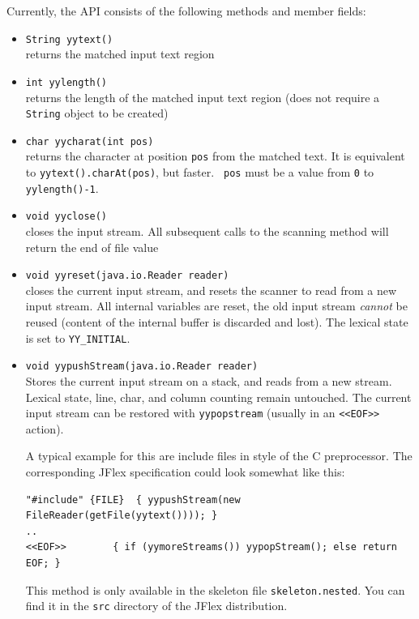 \documentclass[11pt]{scrartcl}
\begin{document}
Currently, the API consists of the following methods and member fields:
\begin{itemize}
\item \texttt{String yytext()}\\
  returns the matched input text region

\item \texttt{int yylength()}\\
  returns the length of the matched input text region (does not require
  a \texttt{String} object to be created)
  
\item \texttt{char yycharat(int pos)}\\
  returns the character at position \texttt{pos} from the matched text.
  It is equivalent to \texttt{yytext().charAt(pos)}, but faster.  {\tt
  pos} must be a value from \texttt{0} to \texttt{yylength()-1}.

\item \texttt{void yyclose()}\\
  closes the input stream. All subsequent calls to the scanning method will 
  return the end of file value    

\item \texttt{void yyreset(java.io.Reader reader)}\\
  closes the current input stream, and resets the scanner to read from
  a new input stream.  All internal variables are reset, the old input
  stream {\em cannot} be reused (content of the internal buffer is
  discarded and lost).  The lexical state is set to \texttt{YY\_INITIAL}.

\item \texttt{void yypushStream(java.io.Reader reader)}\\
 Stores the current input stream on a stack, and
 reads from a new stream. Lexical state, line,
 char, and column counting remain untouched.
 The current input stream can be restored with
 \texttt{yypopstream} (usually in an \texttt{<<EOF>>} action).
 
 A typical example for this are include files in
 style of the C preprocessor. The corresponding 
 JFlex specification could look somewhat like this:
\begin{verbatim}
"#include" {FILE}  { yypushStream(new FileReader(getFile(yytext()))); }
..
<<EOF>>        { if (yymoreStreams()) yypopStream(); else return EOF; }
\end{verbatim}

 This method is only available in the skeleton file
 \texttt{skeleton.nested}. You can find it in the 
 \texttt{src} directory of the JFlex distribution.


\end{itemize}
\end{document}
